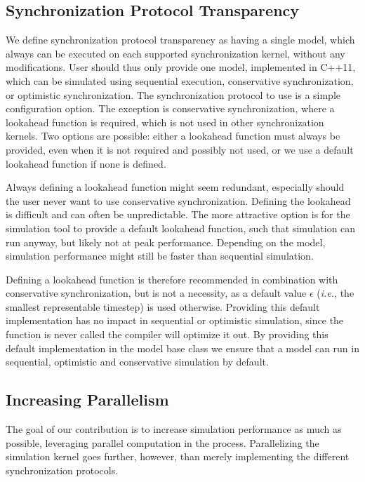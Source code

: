 \subsection{Synchronization Protocol Transparency}
We define synchronization protocol transparency as having a single model, which always can be executed on each supported synchronization kernel, without any modifications.
User should thus only provide one model, implemented in C++11, which can be simulated using sequential execution, conservative synchronization, or optimistic synchronization.
The synchronization protocol to use is a simple configuration option.
The exception is conservative synchronization, where a lookahead function is required, which is not used in other synchronization kernels.
Two options are possible: either a lookahead function must always be provided, even when it is not required and possibly not used, or we use a default lookahead function if none is defined.

Always defining a lookahead function might seem redundant, especially should the user never want to use conservative synchronization.
Defining the lookahead is difficult and can often be unpredictable.
The more attractive option is for the simulation tool to provide a default lookahead function, such that simulation can run anyway, but likely not at peak performance.
Depending on the model, simulation performance might still be faster than sequential simulation. 

Defining a lookahead function is therefore recommended in combination with conservative synchronization, but is not a necessity, as a default value $\epsilon$ (\textit{i.e.}, the smallest representable timestep) is used otherwise. Providing this default implementation has no impact in sequential or optimistic simulation, since the function is never called the compiler will optimize it out. By providing this default implementation in the model base class we ensure that a model can run in sequential, optimistic and conservative simulation by default.

\subsection{Increasing Parallelism}
The goal of our contribution is to increase simulation performance as much as possible, leveraging parallel computation in the process.
Parallelizing the simulation kernel goes further, however, than merely implementing the different synchronization protocols.

